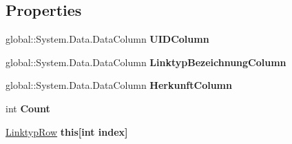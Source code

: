 \subsection*{Properties}
\begin{DoxyCompactItemize}
\item 
global\+::\+System.\+Data.\+Data\+Column {\bfseries U\+I\+D\+Column}\hypertarget{class_products_1_1_data_1_1ds_sage_1_1_linktyp_data_table_aeef3293cf22a3430371fffe444ac37bd}{}\label{class_products_1_1_data_1_1ds_sage_1_1_linktyp_data_table_aeef3293cf22a3430371fffe444ac37bd}

\item 
global\+::\+System.\+Data.\+Data\+Column {\bfseries Linktyp\+Bezeichnung\+Column}\hypertarget{class_products_1_1_data_1_1ds_sage_1_1_linktyp_data_table_afe805a5b2010ad93199a1027925b94a4}{}\label{class_products_1_1_data_1_1ds_sage_1_1_linktyp_data_table_afe805a5b2010ad93199a1027925b94a4}

\item 
global\+::\+System.\+Data.\+Data\+Column {\bfseries Herkunft\+Column}\hypertarget{class_products_1_1_data_1_1ds_sage_1_1_linktyp_data_table_a4ac3257d930b0d199a33e34d5fd5d9e1}{}\label{class_products_1_1_data_1_1ds_sage_1_1_linktyp_data_table_a4ac3257d930b0d199a33e34d5fd5d9e1}

\item 
int {\bfseries Count}\hypertarget{class_products_1_1_data_1_1ds_sage_1_1_linktyp_data_table_a85e6f90fac46f91f1a61a69276d5d7f9}{}\label{class_products_1_1_data_1_1ds_sage_1_1_linktyp_data_table_a85e6f90fac46f91f1a61a69276d5d7f9}

\item 
\hyperlink{class_products_1_1_data_1_1ds_sage_1_1_linktyp_row}{Linktyp\+Row} {\bfseries this\mbox{[}int index\mbox{]}}\hypertarget{class_products_1_1_data_1_1ds_sage_1_1_linktyp_data_table_aa03c5cb883ffbad37ea83507e02fff00}{}\label{class_products_1_1_data_1_1ds_sage_1_1_linktyp_data_table_aa03c5cb883ffbad37ea83507e02fff00}

\end{DoxyCompactItemize}
